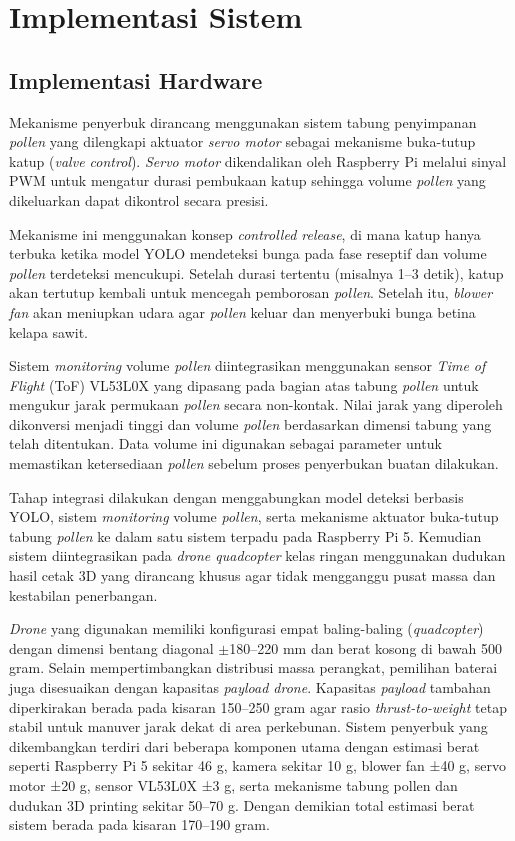 \section{Implementasi Sistem}
\label{sec:implementasi-sistem}

\subsection{Implementasi Hardware}
\label{subsec:implementasi-hardware}

Mekanisme penyerbuk dirancang menggunakan sistem tabung penyimpanan \emph{pollen} yang dilengkapi aktuator \emph{servo motor} sebagai mekanisme buka-tutup katup (\emph{valve control}). \emph{Servo motor} dikendalikan oleh Raspberry Pi melalui sinyal PWM untuk mengatur durasi pembukaan katup sehingga volume \emph{pollen} yang dikeluarkan dapat dikontrol secara presisi.

Mekanisme ini menggunakan konsep \emph{controlled release}, di mana katup hanya terbuka ketika model YOLO mendeteksi bunga pada fase reseptif dan volume \emph{pollen} terdeteksi mencukupi. Setelah durasi tertentu (misalnya 1--3 detik), katup akan tertutup kembali untuk mencegah pemborosan \emph{pollen}. Setelah itu, \emph{blower fan} akan meniupkan udara agar \emph{pollen} keluar dan menyerbuki bunga betina kelapa sawit.

Sistem \emph{monitoring} volume \emph{pollen} diintegrasikan menggunakan sensor \emph{Time of Flight} (ToF) VL53L0X yang dipasang pada bagian atas tabung \emph{pollen} untuk mengukur jarak permukaan \emph{pollen} secara non-kontak. Nilai jarak yang diperoleh dikonversi menjadi tinggi dan volume \emph{pollen} berdasarkan dimensi tabung yang telah ditentukan. Data volume ini digunakan sebagai parameter untuk memastikan ketersediaan \emph{pollen} sebelum proses penyerbukan buatan dilakukan.

Tahap integrasi dilakukan dengan menggabungkan model deteksi berbasis YOLO, sistem \emph{monitoring} volume \emph{pollen}, serta mekanisme aktuator buka-tutup tabung \emph{pollen} ke dalam satu sistem terpadu pada Raspberry Pi 5. Kemudian sistem diintegrasikan pada \emph{drone quadcopter} kelas ringan menggunakan dudukan hasil cetak 3D yang dirancang khusus agar tidak mengganggu pusat massa dan kestabilan penerbangan.

\emph{Drone} yang digunakan memiliki konfigurasi empat baling-baling (\emph{quadcopter}) dengan dimensi bentang diagonal $\pm$180--220 mm dan berat kosong di bawah 500 gram. Selain mempertimbangkan distribusi massa perangkat, pemilihan baterai juga disesuaikan dengan kapasitas \emph{payload drone}. Kapasitas \emph{payload} tambahan diperkirakan berada pada kisaran 150--250 gram agar rasio \emph{thrust-to-weight} tetap stabil untuk manuver jarak dekat di area perkebunan. Sistem penyerbuk yang dikembangkan terdiri dari beberapa komponen utama dengan estimasi berat seperti Raspberry Pi 5 sekitar 46 g, kamera sekitar 10 g, blower fan ±40 g, servo motor ±20 g, sensor VL53L0X ±3 g, serta mekanisme tabung pollen dan dudukan 3D printing sekitar 50–70 g. Dengan demikian total estimasi berat sistem berada pada kisaran 170–190 gram.

